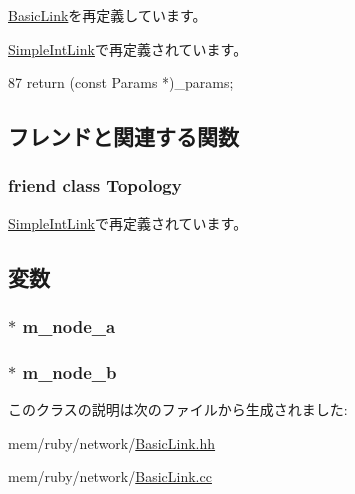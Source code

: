 \hyperlink{classBasicLink_acd3c3feb78ae7a8f88fe0f110a718dff}{BasicLink}を再定義しています。

\hyperlink{classSimpleIntLink_acd3c3feb78ae7a8f88fe0f110a718dff}{SimpleIntLink}で再定義されています。


\begin{DoxyCode}
87 { return (const Params *)_params; }
\end{DoxyCode}


\subsection{フレンドと関連する関数}
\hypertarget{classBasicIntLink_acd2b8699ab7559c0da687cd775e2c778}{
\subsubsection[{Topology}]{\setlength{\rightskip}{0pt plus 5cm}friend class {\bf Topology}}}
\label{classBasicIntLink_acd2b8699ab7559c0da687cd775e2c778}


\hyperlink{classSimpleIntLink_acd2b8699ab7559c0da687cd775e2c778}{SimpleIntLink}で再定義されています。

\subsection{変数}
\hypertarget{classBasicIntLink_a94b382c61156ea4668be8cc92e2e4cbe}{
\subsubsection[{m\_\-node\_\-a}]{$\ast$ {\bf m\_\-node\_\-a}}}
\label{classBasicIntLink_a94b382c61156ea4668be8cc92e2e4cbe}
\hypertarget{classBasicIntLink_aa463d3b72f965545f533b2268d7eb1b5}{
\subsubsection[{m\_\-node\_\-b}]{$\ast$ {\bf m\_\-node\_\-b}}}
\label{classBasicIntLink_aa463d3b72f965545f533b2268d7eb1b5}


このクラスの説明は次のファイルから生成されました:\begin{DoxyCompactItemize}
\item 
mem/ruby/network/\hyperlink{BasicLink_8hh}{BasicLink.hh}\item 
mem/ruby/network/\hyperlink{BasicLink_8cc}{BasicLink.cc}\end{DoxyCompactItemize}
